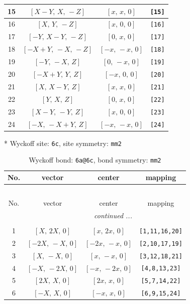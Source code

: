 \documentclass[fleqn,8pt]{jsarticle}
\begin{document}
\begin{longtable}{cccc}
15 & $\left[ X - Y,\, X,\, - Z \right]$ & $\left[ x,\, x,\, 0 \right]$ & {\tt [15]} \\ \hline
16 & $\left[ X,\, Y,\, - Z \right]$ & $\left[ x,\, 0,\, 0 \right]$ & {\tt [16]} \\ \hline
17 & $\left[ - Y,\, X - Y,\, - Z \right]$ & $\left[ 0,\, x,\, 0 \right]$ & {\tt [17]} \\ \hline
18 & $\left[ - X + Y,\, - X,\, - Z \right]$ & $\left[ - x,\, - x,\, 0 \right]$ & {\tt [18]} \\ \hline
19 & $\left[ - Y,\, - X,\, Z \right]$ & $\left[ 0,\, - x,\, 0 \right]$ & {\tt [19]} \\ \hline
20 & $\left[ - X + Y,\, Y,\, Z \right]$ & $\left[ - x,\, 0,\, 0 \right]$ & {\tt [20]} \\ \hline
21 & $\left[ X,\, X - Y,\, Z \right]$ & $\left[ x,\, x,\, 0 \right]$ & {\tt [21]} \\ \hline
22 & $\left[ Y,\, X,\, Z \right]$ & $\left[ 0,\, x,\, 0 \right]$ & {\tt [22]} \\ \hline
23 & $\left[ X - Y,\, - Y,\, Z \right]$ & $\left[ x,\, 0,\, 0 \right]$ & {\tt [23]} \\ \hline
24 & $\left[ - X,\, - X + Y,\, Z \right]$ & $\left[ - x,\, - x,\, 0 \right]$ & {\tt [24]} \\
\end{longtable}
* Wyckoff site: {\tt 6c}, site symmetry: {\tt mm2}
\renewcommand{\arraystretch}{1.2}
\begin{longtable}{cccc}
\caption{Wyckoff bond: {\tt 6a@6c}, bond symmetry: {\tt mm2}}
 \\
 \hline \hline
No. & vector & center & mapping \\ \hline \endfirsthead

\multicolumn{3}{l}{\tablename\ \thetable{}} \\
 \hline \hline
No. & vector & center & mapping \\ \hline \endhead

 \hline \hline
\multicolumn{3}{r}{\footnotesize\it continued ...} \\ \endfoot

 \hline \hline
\multicolumn{3}{r}{} \\ \endlastfoot

1 & $\left[ X,\, 2 X,\, 0 \right]$ & $\left[ x,\, 2 x,\, 0 \right]$ & {\tt [1,11,16,20]} \\ \hline
2 & $\left[ - 2 X,\, - X,\, 0 \right]$ & $\left[ - 2 x,\, - x,\, 0 \right]$ & {\tt [2,10,17,19]} \\ \hline
3 & $\left[ X,\, - X,\, 0 \right]$ & $\left[ x,\, - x,\, 0 \right]$ & {\tt [3,12,18,21]} \\ \hline
4 & $\left[ - X,\, - 2 X,\, 0 \right]$ & $\left[ - x,\, - 2 x,\, 0 \right]$ & {\tt [4,8,13,23]} \\ \hline
5 & $\left[ 2 X,\, X,\, 0 \right]$ & $\left[ 2 x,\, x,\, 0 \right]$ & {\tt [5,7,14,22]} \\ \hline
6 & $\left[ - X,\, X,\, 0 \right]$ & $\left[ - x,\, x,\, 0 \right]$ & {\tt [6,9,15,24]} \\
\end{longtable}
\end{document}
